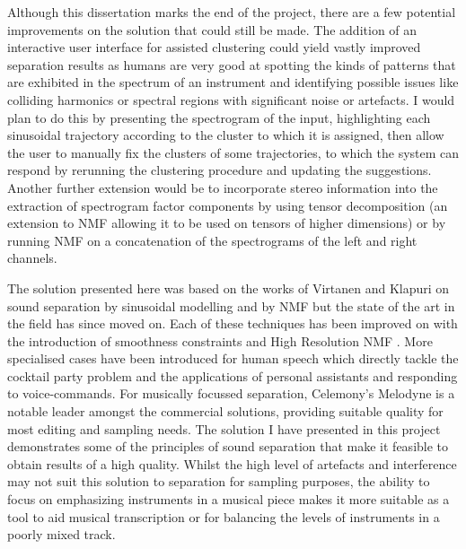 \documentclass[12pt,a4paper,twoside,openright]{report}
\begin{document}
Although this dissertation marks the end of the project, there are a few potential improvements on the solution that could still be made. The addition of an interactive user interface for assisted clustering could yield vastly improved separation results as humans are very good at spotting the kinds of patterns that are exhibited in the spectrum of an instrument and identifying possible issues like colliding harmonics or spectral regions with significant noise or artefacts. I would plan to do this by presenting the spectrogram of the input, highlighting each sinusoidal trajectory according to the cluster to which it is assigned, then allow the user to manually fix the clusters of some trajectories, to which the system can respond by rerunning the clustering procedure and updating the suggestions. Another further extension would be to incorporate stereo information into the extraction of spectrogram factor components by using tensor decomposition (an extension to NMF allowing it to be used on tensors of higher dimensions) or by running NMF on a concatenation of the spectrograms of the left and right channels.


The solution presented here was based on the works of Virtanen and Klapuri \cite{virtanen2000separation} on sound separation by sinusoidal modelling and by NMF \cite{virtanen2003sound} but the state of the art in the field has since moved on. Each of these techniques has been improved on with the introduction of smoothness constraints \cite{virtanen2003algorithm} and High Resolution NMF \cite{badeau2011gaussian}. More specialised cases have been introduced for human speech \cite{schmidt2006single} which directly tackle the cocktail party problem and the applications of personal assistants and responding to voice-commands. For musically focussed separation, Celemony's Melodyne \cite{melodyne} is a notable leader amongst the commercial solutions, providing suitable quality for most editing and sampling needs. {\color{red}The solution I have presented in this project demonstrates some of the principles of sound separation that make it feasible to obtain results of a high quality. Whilst the high level of artefacts and interference may not suit this solution to separation for sampling purposes, the ability to focus on emphasizing instruments in a musical piece makes it more suitable as a tool to aid musical transcription or for balancing the levels of instruments in a poorly mixed track.}

\end{document}
